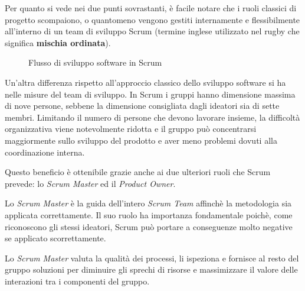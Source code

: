 Per quanto si vede nei due punti sovrastanti, è facile notare che i ruoli
classici di progetto scompaiono, o quantomeno vengono gestiti internamente e
flessibilmente all'interno di un team di sviluppo Scrum (termine inglese
utilizzato nel rugby che significa \textbf{mischia ordinata}).

\begin{figure}[H]%
  \noindent{}%
  \caption{Flusso di sviluppo software in Scrum}%
  \label{fig:scrum-schema}%
\end{figure}%

Un'altra differenza rispetto all'approccio classico dello sviluppo software si
ha nelle misure del team di sviluppo. In Scrum i gruppi hanno dimensione
massima di nove persone, sebbene la dimensione consigliata dagli ideatori sia
di sette membri. Limitando il numero di persone che devono lavorare insieme, la
difficoltà organizzativa viene notevolmente ridotta e il gruppo può
concentrarsi maggiormente sullo sviluppo del prodotto e aver meno problemi
dovuti alla coordinazione interna.

Questo beneficio è ottenibile grazie anche ai due ulteriori ruoli che Scrum
prevede: lo \emph{Scrum Master} ed il \emph{Product Owner}.

Lo \emph{Scrum Master} è la guida dell'intero \emph{Scrum Team} affinchè la
metodologia sia applicata correttamente. Il suo ruolo ha importanza
fondamentale poichè, come riconoscono gli stessi ideatori, Scrum può portare a
conseguenze molto negative se applicato scorrettamente.

Lo \emph{Scrum Master} valuta la qualità dei processi, li ispeziona e fornisce
al resto del gruppo soluzioni per diminuire gli sprechi di risorse e
massimizzare il valore delle interazioni tra i componenti del gruppo.

